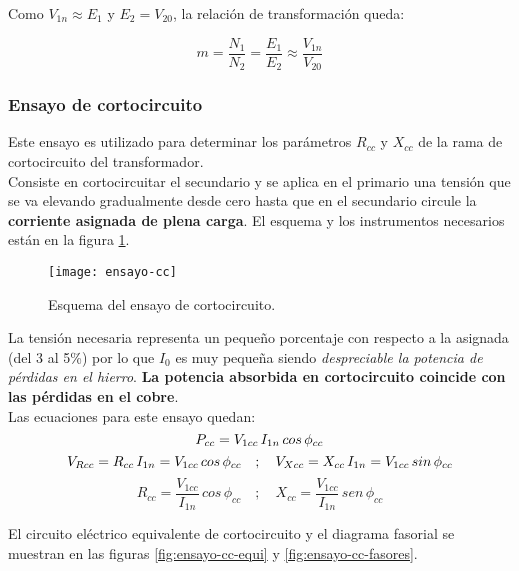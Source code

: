 Como $V_{1n}\approx E_{1}$ y $E_{2}=V_{20}$, la relación de transformación queda:

\begin{equation*}
	m=\dfrac{N_{1}}{N_{2}}=\dfrac{E_{1}}{E_{2}} \approx \dfrac{V_{1n}}{V_{20}}
\end{equation*}

\subsubsection{Ensayo de cortocircuito}

Este ensayo es utilizado para determinar los parámetros $R_{cc}$ y $X_{cc}$ de la rama de cortocircuito del transformador.\\

Consiste en cortocircuitar el secundario y se aplica en el primario una tensión que se va elevando gradualmente desde cero hasta que en el secundario circule la \textbf{corriente asignada de plena carga}. El esquema y los instrumentos necesarios están en la figura \ref{fig:ensayo-cc}.

\begin{figure}[H]
	\centering
	\texttt{[image: ensayo-cc]}
	\caption{Esquema del ensayo de cortocircuito.}
	\label{fig:ensayo-cc}
\end{figure}

La tensión necesaria representa un pequeño porcentaje con respecto a la asignada (del 3 al 5\%) por lo que $I_{0}$ es muy pequeña siendo \textit{despreciable la potencia de pérdidas en el hierro}. \textbf{La potencia absorbida en cortocircuito coincide con las pérdidas en el cobre}.\\

Las ecuaciones para este ensayo quedan:
\begin{equation}
	P_{cc}=V_{1cc}\,I_{1n}\,cos\, \phi_{cc}\\
\end{equation}	
\begin{equation}
	V_{Rcc}=R_{cc}\,I_{1n}=V_{1cc}\,cos\,\phi_{cc}\quad;\quad V_{Xcc}=X_{cc}\,I_{1n}=V_{1cc}\,sin\,\phi_{cc}\\
	\label{eq:caida-cc}
\end{equation}
\begin{equation}
	R_{cc}=\dfrac{V_{1cc}}{I_{1n}}\,cos\,\phi_{cc}\quad;\quad X_{cc}=\dfrac{V_{1cc}}{I_{1n}}\,sen\,\phi_{cc}
	\label{eq:Rcc-Xcc}
\end{equation}

El circuito eléctrico equivalente de cortocircuito y el diagrama fasorial se muestran en las figuras \ref{fig:ensayo-cc-equi} y \ref{fig:ensayo-cc-fasores}.

